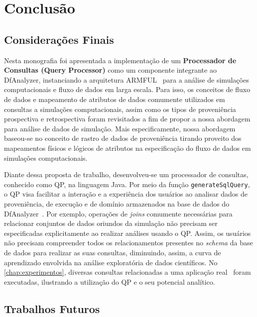 
\chapter{Conclusão}%
\label{chap:conclusao}

\section{Considerações Finais}

Nesta monografia foi apresentada a implementação de um \textbf{Processador de Consultas (Query Processor)} como um componente integrante ao DfAnalyzer, instanciando a arquitetura ARMFUL~\cite{silva2017raw} para a análise de simulações computacionais e fluxo de dados em larga escala. Para isso, os conceitos de fluxo de dados e mapeamento de atributos de dados comumente utilizados em consultas a simulações computacionais, assim como os tipos de proveniência prospectiva e retrospectiva foram revisitados a fim de propor a nossa abordagem para análise de dados de simulação. Mais especificamente, nossa abordagem baseou-se no conceito de rastro de dados de proveniência tirando proveito dos mapeamentos físicos e lógicos de atributos na especificação do fluxo de dados em simulações computacionais. 

Diante dessa proposta de trabalho, desenvolveu-se um processador de consultas, conhecido como QP, na linguagem Java. Por meio da função \texttt{generateSqlQuery}, o QP visa facilitar a interação e a experiência dos usuários ao analisar dados de proveniência, de execução e de domínio armazenados na base de dados do DfAnalyzer~\cite{gadelha2012mtcprov}. Por exemplo, operações de \textit{joins} comumente necessárias para relacionar conjuntos de dados oriundos da simulação não precisam ser especificadas explicitamente ao realizar análises usando o QP. Assim, os usuários não precisam compreender todos os relacionamentos presentes no \textit{schema} da base de dados para realizar as suas consultas, diminuindo, assim, a curva de aprendizado envolvida na análise exploratória de dados científicos. No \autoref{chap:experimentos}, diversas consultas relacionadas a uma aplicação real~\cite{silva2016situ} foram executadas, ilustrando a utilização do QP e o seu potencial analítico.

\section{Trabalhos Futuros}

